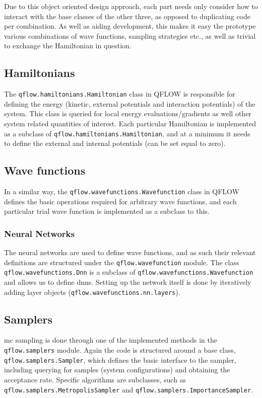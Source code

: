 \documentclass[Thesis.tex]{subfiles}
\begin{document}
Due to this object oriented design approach, each part needs only consider how
to interact with the base classes of the other three, as opposed to duplicating
code per combination. As well as aiding development, this makes it easy the
prototype various combinations of wave functions, sampling strategies etc., as
well as trivial to exchange the Hamiltonian in question.


\subsection{Hamiltonians}

The \texttt{qflow.\-hamiltonians.\-Hamiltonian} class in QFLOW is responsible for defining the energy
(kinetic, external potentials and interaction potentials) of the system. This
class is queried for local energy evaluations/gradients as well other system
related quantities of interest. Each particular Hamiltonian is implemented as a
subclass of \texttt{qflow.\-hamiltonians.\-Hamiltonian}, and at a minimum it needs to define the
external and internal potentials (can be set equal to zero).

\subsection{Wave functions}

In a similar way, the \texttt{qflow.\-wavefunctions.\-Wavefunction} class in QFLOW defines the basic
operations required for arbitrary wave functions, and each particular trial wave
function is implemented as a subclass to this.

\subsubsection{Neural Networks}

The neural networks are used to define wave functions, and as such their
relevant definitions are structured under the \texttt{qflow.\-wavefunction} module. The
class \texttt{qflow.\-wavefunctions.\-Dnn}  is a subclass of
\texttt{qflow.\-wavefunctions.\-Wavefunction} and allows us to define \glspl{dnn}.
Setting up the network itself is done by iteratively adding layer objects (\texttt{qflow.\-wavefunctions.\-nn.\-layers}).

\subsection{Samplers}

\Gls{mc} sampling is done through one of the implemented methods in the
\texttt{qflow.\-samplers} module. Again the code is structured around a base
class, \texttt{qflow.\-samplers.\-Sampler}, which defines the basic interface to the
sampler, including querying for samples (system configurations) and obtaining
the acceptance rate. Specific algorithms are subclasses, such as
\texttt{qflow.\-samplers.\-MetropolisSampler} and
\texttt{qflow.\-samplers.\-ImportanceSampler}.
\end{document}
